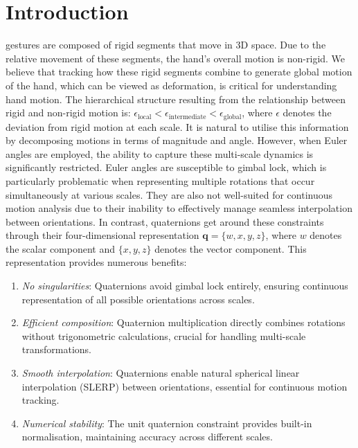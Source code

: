 \documentclass[journal]{IEEEtran}
\theoremstyle{plain}
\begin{document}
\section{Introduction}
 gestures are composed of rigid segments that move in 3D space. Due to the relative movement of these segments, the hand's overall motion is non-rigid. We believe that tracking how these rigid segments combine to generate global motion of the hand, which can be viewed as deformation, is critical for understanding hand motion. The hierarchical structure resulting from the relationship between rigid and non-rigid motion is: \(\epsilon_{\text{local}} < \epsilon_{\text{intermediate}} < \epsilon_{\text{global}}\), where \(\epsilon\) denotes the deviation from rigid motion at each scale. It is natural to utilise this information by decomposing motions in terms of magnitude and angle. However, when Euler angles are employed, the ability to capture these multi-scale dynamics is significantly restricted. Euler angles are susceptible to gimbal lock, which is particularly problematic when representing multiple rotations that occur simultaneously at various scales. They are also not well-suited for continuous motion analysis due to their inability to effectively manage seamless interpolation between orientations. In contrast, quaternions get around these constraints through their four-dimensional representation \(\mathbf{q} = \{w, x, y, z\}\), where \(w\) denotes the scalar component and \(\{x, y, z\}\) denotes the vector component. This representation provides numerous benefits:
\begin{enumerate}
    \item \textit{No singularities}: Quaternions avoid gimbal lock entirely, ensuring continuous representation of all possible orientations across scales.
    \item \textit{Efficient composition}: Quaternion multiplication directly combines rotations without trigonometric calculations, crucial for handling multi-scale transformations.
    \item \textit{Smooth interpolation}: Quaternions enable natural spherical linear interpolation (SLERP) between orientations, essential for continuous motion tracking.
    \item \textit{Numerical stability}: The unit quaternion constraint provides built-in normalisation, maintaining accuracy across different scales.
\end{enumerate}
\end{document}
